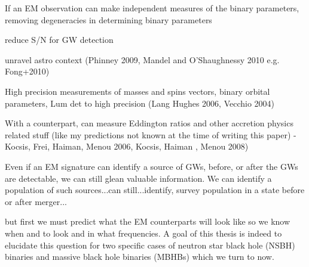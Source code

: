 If an EM observation can make independent measures of the binary parameters,
removing degeneracies in determining binary parameters \citep{HughesHolz 2003}

reduce S/N for GW detection \citep{KochanekPiran:1993, HarryFairhurst 2011}


unravel astro context (Phinney 2009, Mandel and O'Shaughnessy 2010 e.g.
Fong+2010)




High precision measurements of masses and spins vectors, binary orbital
parameters, Lum det to high precision (Lang Hughes 2006, Vecchio 2004)

With a counterpart, can measure Eddington ratios and other accretion physics
related stuff (like my predictions not known at the time of writing this
paper) - Kocsis, Frei, Haiman, Menou 2006, Kocsis, Haiman , Menou 2008)



Even if an EM signature can identify a source of GWs, before, or after the GWs
are detectable, we can still glean valuable information. We can identify a
population of such sources...can still...identify, survey population in a
state before or after merger...


but first we must predict what the EM counterparts will look like so we know
when and to look and in what frequencies. A goal of this thesis is indeed to
elucidate this question for two specific cases of neutron star black hole
(NSBH) binaries and massive black hole binaries (MBHBs) which we turn to now.





